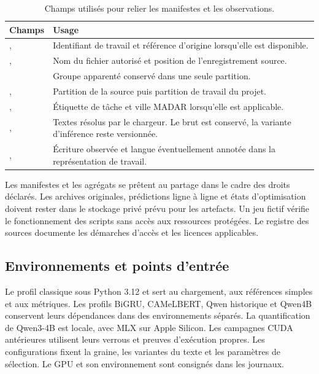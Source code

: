 \begin{table}[htbp]
\centering\small
\caption{Champs utilisés pour relier les manifestes et les observations.}
\begin{tabularx}{\linewidth}{@{}P{48mm}Y@{}}
\toprule
Champs & Usage \\
\midrule
{},  & Identifiant de travail et référence d’origine lorsqu’elle est disponible. \\
,  & Nom du fichier autorisé et position de l’enregistrement source. \\
 & Groupe apparenté conservé dans une seule partition. \\
,  & Partition de la source puis partition de travail du projet. \\
,  & Étiquette de tâche et ville MADAR lorsqu’elle est applicable. \\
,  & Textes résolus par le chargeur. Le brut est conservé, la variante d’inférence reste versionnée. \\
,  & Écriture observée et langue éventuellement annotée dans la représentation de travail. \\
\bottomrule
\end{tabularx}
\end{table}

Les manifestes et les agrégats se prêtent au partage dans le cadre des droits déclarés. Les archives originales, prédictions ligne à ligne et états d’optimisation doivent rester dans le stockage privé prévu pour les artefacts. Un jeu fictif vérifie le fonctionnement des scripts sans accès aux ressources protégées. Le registre des sources documente les démarches d’accès et les licences applicables.

\subsection{Environnements et points d’entrée}
Le profil classique sous Python 3.12 et  sert au chargement, aux références simples et aux métriques. Les profils BiGRU, CAMeLBERT, Qwen historique et Qwen4B conservent leurs dépendances dans des environnements séparés. La quantification de Qwen3-4B est locale, avec MLX sur Apple Silicon. Les campagnes CUDA antérieures utilisent leurs verrous et preuves d’exécution propres. Les configurations fixent la graine, les variantes du texte et les paramètres de sélection. Le GPU et son environnement sont consignés dans les journaux.

